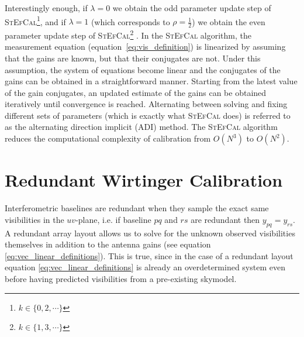 \documentclass[useAMS,usenatbib]{mn2e}
\begin{document}
Interestingly enough, if $\lambda = 0$ we obtain the odd parameter update step of \textsc{StEfCal}\footnote{$k\in\{0,2,\cdots\}$}, and if $\lambda=1$ (which corresponds
to $\rho=\frac{1}{2}$) we obtain the even parameter update step of \textsc{StEfCal}\footnote{$k\in\{1,3,\cdots\}$} \citep[\textsc{StEfCal},][]{Mitchell:MWA-cal,Salvini2014}. In the \textsc{StEfCal} algorithm, the measurement equation (equation~\ref{eq:vis_definition}) is linearized by assuming that the gains are known, but that their conjugates are not. Under this assumption, the system of equations become linear and the conjugates of the gains can be obtained in a straightforward manner. Starting from the latest value of the gain conjugates, an updated estimate of the gains can be obtained iteratively until convergence is reached.
Alternating between solving and fixing different sets of parameters (which is exactly what \textsc{StEfCal} does) is referred to 
as the alternating direction implicit (ADI) method. The \textsc{StEfCal} algorithm reduces the computational complexity of calibration from $O(N^3)$ to $O(N^2)$.

\section{Redundant Wirtinger Calibration}
\label{sec:red_wirtinger}
Interferometric baselines are redundant when they sample the exact same visibilities in the $uv$-plane, i.e. if baseline $pq$ and $rs$ are redundant then $y_{pq} = y_{rs}$. 
A redundant array layout allows us to solve for the unknown observed visibilities themselves in
addition to the antenna gains (see equation \ref{eq:vec_linear_definitions}). This is true, since in the case of a redundant layout equation \ref{eq:vec_linear_definitions} is already an overdetermined 
system even before having predicted visibilities from a pre-existing skymodel. 

\end{document}
